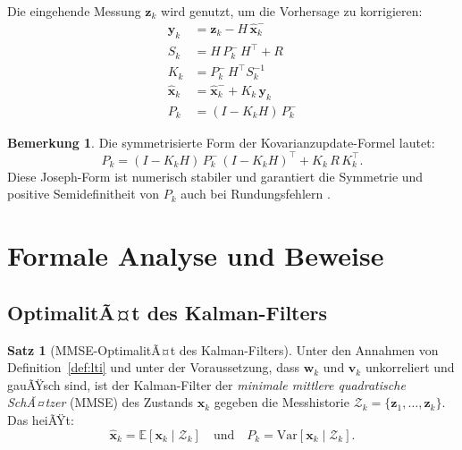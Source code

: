 ﻿\documentclass[a4paper,12pt]{article}
\theoremstyle{definition}
\newtheorem{satz}{Satz}
\newtheorem{bemerkung}{Bemerkung}
\begin{document}
Die eingehende Messung $\mathbf{z}_k$ wird genutzt, um die Vorhersage zu korrigieren:
\begin{align}
    \mathbf{y}_k   &= \mathbf{z}_k - H\,\hat{\mathbf{x}}_k^-
        \label{eq:innov} \\
    S_k             &= H\,P_k^-\,H^\top + R
        \label{eq:innov_cov} \\
    K_k             &= P_k^-\,H^\top S_k^{-1}
        \label{eq:gain} \\
    \hat{\mathbf{x}}_k &= \hat{\mathbf{x}}_k^- + K_k\,\mathbf{y}_k
        \label{eq:update_state} \\
    P_k             &= (I - K_k H)\,P_k^-
        \label{eq:update_cov}
\end{align}

\begin{bemerkung}
    Die symmetrisierte Form der Kovarianz\-update-Formel lautet:
    \[
        P_k = (I - K_k H)\,P_k^-\,(I - K_k H)^\top + K_k\,R\,K_k^\top.
    \]
    Diese Joseph-Form ist numerisch stabiler und garantiert die Symmetrie und
    positive Semidefinitheit von $P_k$ auch bei Rundungsfehlern \cite{joseph1968}.
\end{bemerkung}

\section{Formale Analyse und Beweise}

\subsection{OptimalitÃ¤t des Kalman-Filters}

\begin{satz}[MMSE-OptimalitÃ¤t des Kalman-Filters]
\label{satz:mmse}
    Unter den Annahmen von Definition~\ref{def:lti} und unter der Voraussetzung, dass
    $\mathbf{w}_k$ und $\mathbf{v}_k$ unkorreliert und gauÃŸsch sind, ist der Kalman-Filter
    der \emph{minimale mittlere quadratische SchÃ¤tzer} (MMSE) des Zustands $\mathbf{x}_k$
    gegeben die Messhistorie $\mathcal{Z}_k = \{\mathbf{z}_1, \ldots, \mathbf{z}_k\}$.
    Das heiÃŸt:
    \[
        \hat{\mathbf{x}}_k = \mathbb{E}[\mathbf{x}_k \mid \mathcal{Z}_k]
        \quad \text{und} \quad
        P_k = \mathrm{Var}[\mathbf{x}_k \mid \mathcal{Z}_k].
    \]
\end{satz}
\end{document}
